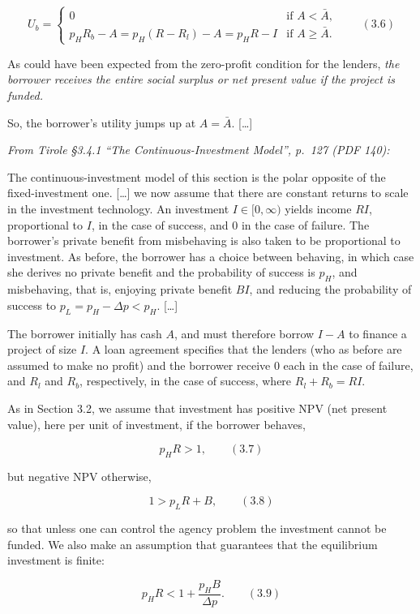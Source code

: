 \documentclass[11pt,a4paper]{article}
\begin{document}
\[U_b = \begin{cases} 0 & \text{if } A < \bar A, \\ p_H R_b - A = p_H(R - R_l) - A = p_H R - I & \text{if } A \geqslant \bar A. \end{cases} \qquad (3.6)\]

As could have been expected from the zero-profit condition for the lenders, \emph{the borrower
receives the entire social surplus or net present value if the project is funded.}

So, the borrower's utility jumps up at \(A = \bar A\). {[}\ldots{]}

\emph{From Tirole §3.4.1 ``The Continuous-Investment Model'', p.~127 (PDF 140):}

The continuous-investment model of this section is the polar opposite of the fixed-investment one.
{[}\ldots{]} we now assume that there are constant returns to scale in the investment technology. An
investment \(I \in [0, \infty)\) yields income \(RI\), proportional to \(I\), in the case of
success, and 0 in the case of failure. The borrower's private benefit from misbehaving is also taken
to be proportional to investment. As before, the borrower has a choice between behaving, in which
case she derives no private benefit and the probability of success is \(p_H\), and misbehaving, that
is, enjoying private benefit \(BI\), and reducing the probability of success to
\(p_L = p_H - \Delta p < p_H\). {[}\ldots{]}

The borrower initially has cash \(A\), and must therefore borrow \(I - A\) to finance a project of
size \(I\). A loan agreement specifies that the lenders (who as before are assumed to make no
profit) and the borrower receive 0 each in the case of failure, and \(R_l\) and \(R_b\),
respectively, in the case of success, where \(R_l + R_b = RI\).

As in Section 3.2, we assume that investment has positive NPV (net present value), here per unit of
investment, if the borrower behaves,

\[p_H R > 1, \qquad (3.7)\]

but negative NPV otherwise,

\[1 > p_L R + B, \qquad (3.8)\]

so that unless one can control the agency problem the investment cannot be funded. We also make an
assumption that guarantees that the equilibrium investment is finite:

\[p_H R < 1 + \frac{p_H B}{\Delta p}. \qquad (3.9)\]
\end{document}
